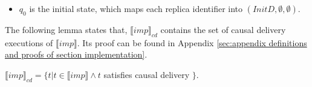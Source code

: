 \begin {itemize}
    Let us explain $< \otimes m$. $< \otimes m$ will change $<$ as follows:

    \begin{itemize}
    \setlength{\itemsep}{0.5pt}
    \item[-] $\forall k' \neq r$, if $(dat,r_1,k') \in msgs(k')$, then add $((dat,r_1,k'),k')$. 

    \end{itemize}

\item[-] $q_0$ is the initial state, which maps each replica identifier into $(InitD,\emptyset,\emptyset)$. 
\end{itemize}

The following lemma states that, $\llbracket imp \rrbracket_{cd}$ contains the set of causal delivery executions of $\llbracket imp \rrbracket$. Its proof can be found in Appendix \ref{sec:appendix definitions and proofs of section implementation}.

\begin{lemma}
\label{lemma:semantics of imp cd contains the set of causal delivery executions of semantics of imp}

$\llbracket imp \rrbracket_{cd} = \{ t \vert t \in \llbracket imp \rrbracket \wedge t$ satisfies causal delivery $\}$. 
\end{lemma}


